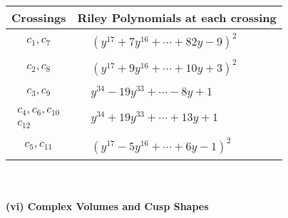 \documentclass[1p]{elsarticle_modified}
\theoremstyle{definition}
\begin{document}
\begin{tabular}{m{50pt}|m{274pt}}
Crossings & \hspace{64pt}Riley Polynomials at each crossing \\
\hline $$\begin{aligned}c_{1},c_{7}\end{aligned}$$&$\begin{aligned}
&(y^{17}+7 y^{16}+\cdots+82 y-9)^{2}
\end{aligned}$\\
\hline $$\begin{aligned}c_{2},c_{8}\end{aligned}$$&$\begin{aligned}
&(y^{17}+9 y^{16}+\cdots+10 y+3)^{2}
\end{aligned}$\\
\hline $$\begin{aligned}c_{3},c_{9}\end{aligned}$$&$\begin{aligned}
&y^{34}-19 y^{33}+\cdots-8 y+1
\end{aligned}$\\
\hline $$\begin{aligned}c_{4},c_{6},c_{10}\\c_{12}\end{aligned}$$&$\begin{aligned}
&y^{34}+19 y^{33}+\cdots+13 y+1
\end{aligned}$\\
\hline $$\begin{aligned}c_{5},c_{11}\end{aligned}$$&$\begin{aligned}
&(y^{17}-5 y^{16}+\cdots+6 y-1)^{2}
\end{aligned}$\\
\hline
\end{tabular}\\~\\
\newpage\flushleft \textbf{(vi) Complex Volumes and Cusp Shapes}
\end{document}
